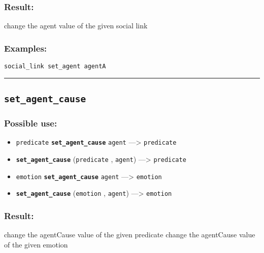 \documentclass[]{book}
\providecommand{\tightlist}{%
  \setlength{\itemsep}{0pt}\setlength{\parskip}{0pt}}
\theoremstyle{definition}
\theoremstyle{definition}
\theoremstyle{definition}
\theoremstyle{remark}
\begin{document}
\subsubsection{Result:}\label{result-439}

change the agent value of the given social link

\subsubsection{Examples:}\label{examples-312}

\begin{verbatim}
social_link set_agent agentA 
\end{verbatim}

\begin{center}\rule{0.5\linewidth}{\linethickness}\end{center}

\subsection{\texorpdfstring{\texttt{set\_agent\_cause}}{set\_agent\_cause}}\label{set_agent_cause}

\subsubsection{Possible use:}\label{possible-use-456}

\begin{itemize}
\tightlist
\item
  \texttt{predicate} \textbf{\texttt{set\_agent\_cause}} \texttt{agent}
  ---\textgreater{} \texttt{predicate}
\item
  \textbf{\texttt{set\_agent\_cause}} (\texttt{predicate} ,
  \texttt{agent}) ---\textgreater{} \texttt{predicate}
\item
  \texttt{emotion} \textbf{\texttt{set\_agent\_cause}} \texttt{agent}
  ---\textgreater{} \texttt{emotion}
\item
  \textbf{\texttt{set\_agent\_cause}} (\texttt{emotion} ,
  \texttt{agent}) ---\textgreater{} \texttt{emotion}
\end{itemize}

\subsubsection{Result:}\label{result-440}

change the agentCause value of the given predicate change the agentCause
value of the given emotion
\end{document}
